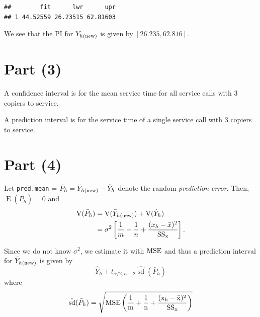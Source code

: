 \documentclass[
]{article}
\begin{document}
\begin{verbatim}
##        fit      lwr      upr
## 1 44.52559 26.23515 62.81603
\end{verbatim}

We see that the PI for \(Y_{h(\rm{new})}\) is given by
\([26.235,62.816]\).

\hypertarget{part-3}{%
\section{Part (3)}\label{part-3}}


A confidence interval is for the mean service time for all service calls
with \(3\) copiers to service.

A prediction interval is for the service time of a single service call
with \(3\) copiers to service.

\hypertarget{part-4}{%
\section{Part (4)}\label{part-4}}


Let \texttt{pred.mean} =
\(\bar{P}_h = \bar{Y}_{h(\rm{new})} - \hat{Y}_h\) denote the random
\emph{prediction error}. Then, \(\operatorname{E}(\bar{P}_h) = 0\) and
\begin{align*}
  \operatorname{V}(\bar{P}_h)
    &= \operatorname{V}(\bar{Y}_{h(\rm{new})}) + \operatorname{V}(\hat{Y}_h)\\
    &= \sigma^2 \left[\frac{1}{m} + \frac{1}{n} + \frac{(x_h - \bar{x})^2}{\rm{SS}_x}\right].
\end{align*}

Since we do not know \(\sigma^2\), we estimate it with \(\rm{MSE}\) and
thus a prediction interval for \(\bar{Y}_{h(\rm{new})}\) is given by \[
  \hat{Y}_h \pm t_{\alpha/2,n-2} \hat{\operatorname{sd}}(\bar{P}_h)
\] where \[
  \hat{\operatorname{sd}}(\bar{P}_h) = \sqrt{\rm{MSE}\left(\frac{1}{m} + \frac{1}{n} + \frac{(x_h-\bar{x})^2}{\rm{SS}_x}\right)}
\]
\end{document}
